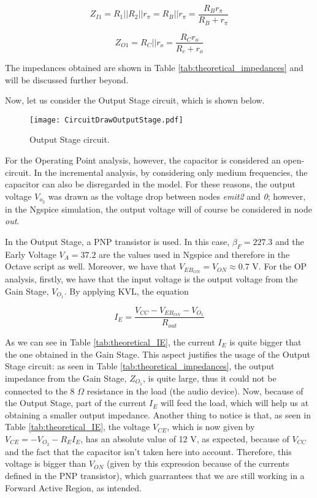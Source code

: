 \begin{equation} \label{eq:input_impedance_GainStage}
Z_{I1}=R_1||R_2||r_{\pi}=R_B||r_{\pi}=\frac{R_Br_{\pi}}{R_B+r_{\pi}}
\end{equation}

\begin{equation} \label{eq:output_impedance_GainStage}
  Z_{O1}=R_C||r_o=\frac{R_Cr_o}{R_c+r_o}
\end{equation}

The impedances obtained are shown in Table \ref{tab:theoretical_impedances} and will be discussed further beyond.
\par
Now, let us consider the Output Stage circuit, which is shown below.

\begin{figure}[H] \centering
  \texttt{[image: CircuitDrawOutputStage.pdf]}
  \caption{Output Stage circuit.}
  \label{fig:CircuitDrawOutputStage}
\end{figure}

For the Operating Point analysis, however, the capacitor is considered an open-circuit. In the incremental analysis, by considering only medium frequencies, the capacitor can also be disregarded in the model. For these reasons, the output voltage $V_{o_2}$ was drawn as the voltage drop between nodes \textit{emit2} and \textit{0}; however, in the Ngspice simulation, the output voltage will of course be considered in node \textit{out}.
\par
In the Output Stage, a PNP transistor is used. In this case, $\beta_F=227.3$ and the Early Voltage $V_A=37.2$ are the values used in Ngspice and therefore in the Octave script as well. Moreover, we have that  $V_{EB_{ON}}=V_{ON}\approx0.7$ V. For the OP analysis, firstly, we have that the input voltage is the output voltage from the Gain Stage, $V_{O_1}$. By applying KVL, the equation

\begin{equation} \label{eq:IE_OutputStage}
  I_E=\frac{V_{CC}-V_{EB_{ON}}-V_{O_1}}{R_{out}}
\end{equation}

As we can see in Table \ref{tab:theoretical_IE}, the current $I_E$ is quite bigger that the one obtained in the Gain Stage. This aspect justifies the usage of the Output Stage circuit: as seen in Table \ref{tab:theoretical_impedances}, the output impedance from the Gain Stage, $Z_{O_1}$, is quite large, thus it could not be connected to the 8 $\Omega$ resistance in the load (the audio device). Now, because of the Output Stage, part of the current $I_E$ will feed the load, which will help us at obtaining a smaller output impedance. Another thing to notice is that, as seen in Table \ref{tab:theoretical_IE}, the voltage $V_{CE}$, which is now given by $V_{CE}=-V_{O_2}-R_EI_E$, has an absolute value of 12 V, as expected, because of $V_{CC}$ and the fact that the capacitor isn't taken here into account. Therefore, this voltage is bigger than $V_{ON}$ (given by this expression because of the currents defined in the PNP transistor), which guarrantees that we are still working in a Forward Active Region, as intended.

